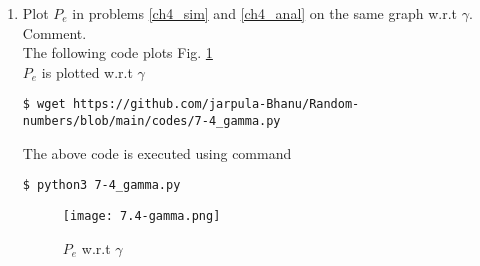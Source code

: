 \documentclass[journal,12pt,twocolumn]{IEEEtran}
\renewcommand\thesection{\arabic{section}}
\begin{document}
\begin{enumerate}[label=\thesection.\arabic*
,ref=\thesection.\theenumi]
\item
Plot $P_e$ in problems \ref{ch4_sim} and \ref{ch4_anal} on the same graph w.r.t $\gamma$.  Comment.\\
\solution  The following code plots Fig. \ref{fig:7.4-gamma}\\
$P_e$ is plotted w.r.t $\gamma$
\begin{lstlisting}
$ wget https://github.com/jarpula-Bhanu/Random-numbers/blob/main/codes/7-4_gamma.py
\end{lstlisting}
The above code is executed using command
\begin{lstlisting}
$ python3 7-4_gamma.py
\end{lstlisting}
\begin{figure}[h]
    \centering
    \texttt{[image: 7.4-gamma.png]}
    \caption{$P_e$ w.r.t $\gamma$}
    \label{fig:7.4-gamma}
\end{figure}


\end{enumerate}
\end{document}
